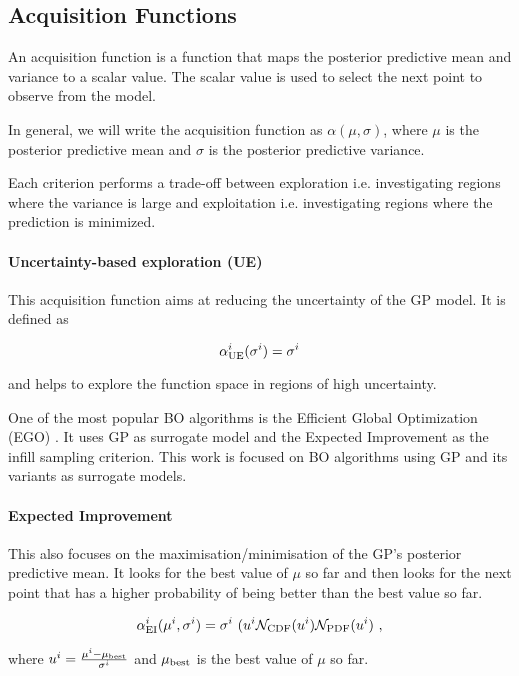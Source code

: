 \documentclass[twocolumn]{aastex631}
\begin{document}
\subsection{Acquisition Functions}

An acquisition function is a function that maps the posterior predictive mean and variance to a scalar value. The scalar value is used to select the next point to observe from the model.

In general, we will write the acquisition function as $\alpha(\mu,\sigma)$, where $\mu$ is the posterior predictive mean and $\sigma$ is the posterior predictive variance.

Each criterion performs a trade-off between exploration i.e. investigating regions where the variance is large and exploitation i.e. investigating regions where the prediction is minimized.

\paragraph{Uncertainty-based exploration (UE)}

This acquisition function aims at reducing the uncertainty of the GP model. It is defined as

$$
\alpha_{\rm{UE}}^i(\sigma^i)= \sigma^i
$$

and helps to explore the function space in regions of high uncertainty.

One of the most popular BO algorithms is the Efficient Global Optimization (EGO) \cite{jones1998efficient}.
It uses GP as surrogate model and the Expected Improvement as the infill sampling criterion. This work is focused on BO algorithms using GP and its variants as surrogate models.


\paragraph{Expected Improvement}

This also focuses on the maximisation/minimisation of the GP's posterior predictive mean.
It looks for the best value of $\mu$ so far and then looks for the next point that has a higher probability of being better than the best value so far.

$$
\alpha_{\rm{EI}}^i(\mu^i, \sigma^i)= \sigma^i\ (u^i \mathcal{N}_{\rm CDF}(u^i) \mathcal{N}_{\rm PDF}(u^i)\ ,
$$

where $u^i = \frac{\mu^i - \mu_{\rm{best}}}{\sigma^i}$ and $\mu_{\rm{best}}$ is the best value of $\mu$ so far.
\end{document}
